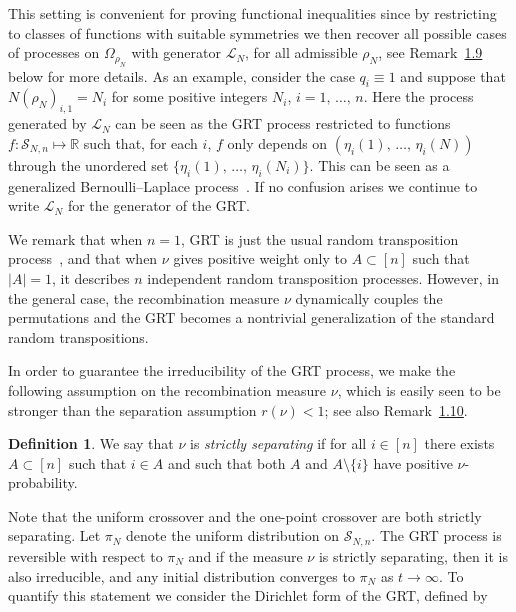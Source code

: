\documentclass[10pt,a4paper]{amsart}
\newcommand{\cL}{\mathcal{L}}
\newcommand{\cS}{\mathcal{S}}
\newcommand{\bbR}{\mathbb{R}}
\let\r=\rho
\let\O=\Omega
\theoremstyle{definition}
\newtheorem{defi}[theo]{Definition}
\theoremstyle{plain}
\numberwithin{equation}{section}
\begin{document}
This setting is convenient for proving functional inequalities since by restricting to classes of functions with suitable symmetries we then recover all possible cases of processes on $\O_{\r_N}$ with generator $\cL_N$, for all admissible $\r_N$, see Remark~\href{https://ahl.centre-mersenne.org/item/AHL_2024__7__1245_0/}{1.9} below for more details. As an example, consider the case $q_i\equiv 1$ and suppose that $N(\r_N)_{i,1} = N_i$ for some positive integers $N_i$, $i=1,\,\dots,\, n$. Here the process generated by $\cL_N$ can be seen as the GRT process restricted to functions $f:\cS_{N,n}\mapsto\bbR$ such that, for each $i$, $f$ only depends on $(\eta_i(1),\,\dots,\,\eta_i(N))$ through the unordered set $\{\eta_i(1),\,\dots,\,\eta_i(N_i)\}$. This can be seen as a generalized Bernoulli--Laplace process~\cite{DS}. If no confusion arises we continue to write $\cL_N$ for the generator of the GRT.


We remark that when $n=1$, GRT is just the usual random transposition process~\cite{DiacShash}, and that when $\nu$ gives positive weight only to $A\subset [n]$ such that $|A|=1$, it describes $n$ independent random transposition processes. However, in the general case, the recombination measure $\nu$ dynamically couples the permutations and the GRT becomes a nontrivial generalization of the standard random transpositions.


In order to guarantee the irreducibility of the GRT process, we make the following assumption on the recombination measure $\nu$, which is easily seen to be stronger than the separation assumption $r(\nu)<1$; see also Remark~\href{https://ahl.centre-mersenne.org/item/AHL_2024__7__1245_0/}{1.10}.

\setcounter{theo}{6}
\begin{defi}\label{def:strict}
We say that $\nu$ is \emph{strictly separating} if for all $i\in[n]$ there exists $A\subset [n]$ such that $i\in A$ and such that both $A$ and $A\setminus\{i\}$ have positive $\nu$-probability.
\end{defi}

\setcounter{equation}{11}
Note that the uniform crossover and the one-point crossover are both strictly separating. Let $\pi_N$ denote the uniform distribution on $\cS_{N,n}$. The GRT process is reversible with respect to $\pi_N$ and if the measure $\nu$ is strictly separating, then it is also irreducible, and any initial distribution converges to $\pi_N$ as $t\to\infty$. To quantify this statement we consider the Dirichlet form of the GRT, defined by
\end{document}

